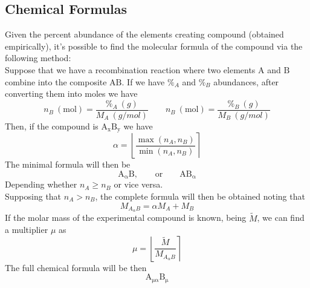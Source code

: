 \documentclass[../qm.tex]{subfiles}
\begin{document}
\subsection{Chemical Formulas}
\begin{mtd}
	Given the percent abundance of the elements creating compound (obtained empirically), it's possible to find the molecular formula of the compound via the following method:\\
	Suppose that we have a recombination reaction where two elements $\mathrm{A}$ and $\mathrm{B}$ combine into the composite $\mathrm{AB}$. If we have $\%_A$ and $\%_B$ abundances, after converting them into moles we have
	\begin{equation*}
		n_B\ (\mathrm{mol})=\frac{\%_A\ (g)}{M_A\ (g/mol)}\qquad n_B\ (\mathrm{mol})=\frac{\%_B\ (g)}{M_B\ (g/mol)}
	\end{equation*}
	Then, if the compound is $\mathrm{A_xB_y}$ we have
	\begin{equation*}
		\alpha=\left\lfloor\frac{\max\left( n_A, n_B \right)}{\min\left( n_A, n_B \right)}\right\rceil
	\end{equation*}
	The minimal formula will then be 
	\begin{equation*}
		\mathrm{A_\alpha B}, \qquad\text{or}\qquad\mathrm{AB_\alpha}
	\end{equation*}
	Depending whether $n_A\ge n_B$ or vice versa.\\
	Supposing that $n_A>n_B$, the complete formula will then be obtained noting that
	\begin{equation*}
		M_{A_\alpha B}=\alpha M_A+M_B
	\end{equation*}
	If the molar mass of the experimental compound is known, being $\tilde{M}$, we can find a multiplier $\mu$ as
	\begin{equation*}
		\mu=\left\lfloor\frac{\tilde{M}}{M_{A_\alpha B}}\right\rceil
	\end{equation*}
	The full chemical formula will be then
	\begin{equation*}
		\mathrm{A_{\mu\alpha}B_{\mu}}
	\end{equation*}
\end{mtd}
\end{document}
